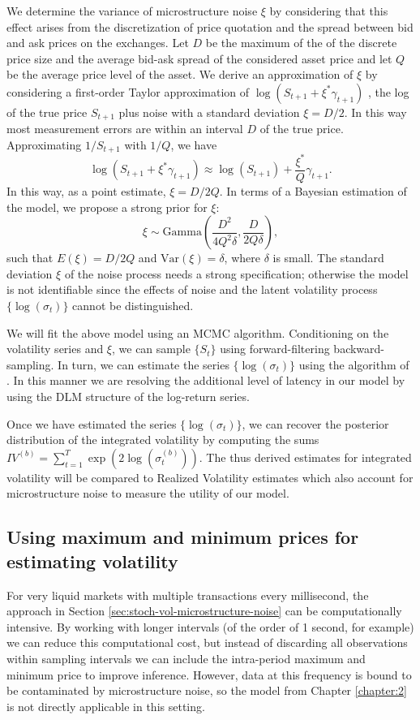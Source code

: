 We determine the variance of microstructure noise $\xi$ by considering that this effect arises from the discretization of price quotation and the spread between bid and ask prices on the exchanges. Let $D$ be the maximum of the of the discrete price size and the average bid-ask spread of the considered asset price and let $Q$ be the average price level of the asset. We derive an approximation of $\xi$ by considering a first-order Taylor approximation of $\log(S_{t+1} + \xi^* \gamma_{t+1})$ , the log of the true price $S_{t+1}$ plus noise with a standard deviation $\xi = D/2$. In this way most measurement errors are within an interval $D$ of the true price. Approximating $1/S_{t+1}$ with $1/Q$, we have 
%
\[ \log(S_{t+1} + \xi^* \gamma_{t+1}) \approx \log(S_{t+1}) + \frac{\xi^*}{Q}\gamma_{t+1}. \] 
%
In this way, as a point estimate, $\xi = D/2Q$. In terms of a Bayesian estimation of the model, we propose a strong prior for $\xi$:
%
\[ \xi \sim \mbox{Gamma}\left( \frac{D^2}{4 Q^2 \delta }, \frac{D}{2Q \delta} \right), \]
%
such that $E(\xi) = D/2Q$ and $\mbox{Var}(\xi) = \delta$, where $\delta$ is small. The standard deviation $\xi$ of the noise process needs a strong specification; otherwise the model is not identifiable since the effects of noise and the latent volatility process $\{ \log(\sigma_t) \}$ cannot be distinguished.   


We will fit the above model using an MCMC algorithm. Conditioning on the volatility series and $\xi$, we can sample  $\{ S_t \}$ using forward-filtering backward-sampling. In turn, we can estimate the series $\{ \log( \sigma_t ) \}$ using the algorithm of \cite{omori2007stochastic}. In this manner we are resolving the additional level of latency in our model by using the DLM structure of the log-return series. 
	
Once we have estimated the series $\{ \log( \sigma_t ) \}$, we can recover the posterior distribution of the integrated volatility by computing the sums $IV^{(b)} = \sum_{t=1}^T \exp( 2\log(\sigma_t^{(b)}) )$. The thus derived estimates for integrated volatility will be compared to Realized Volatility estimates which also account for microstructure noise to measure the utility of our model. 

\subsection{Using maximum and minimum prices for estimating volatility}

For very liquid markets with multiple transactions every millisecond, the approach in Section \ref{sec:stoch-vol-microstructure-noise} can be computationally intensive. By working with longer intervals (of the order of 1 second, for example) we can reduce this computational cost, but instead of discarding all observations within sampling intervals we can include the intra-period maximum and minimum price to improve inference. However, data at this frequency is bound to be contaminated by microstructure noise, so the model from Chapter \ref{chapter:2} is not directly applicable in this setting. 

